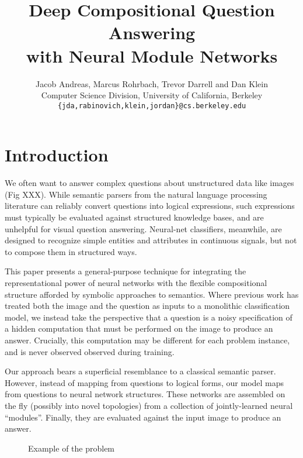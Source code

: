 \documentclass{article} %
\title{Deep Compositional Question Answering \\ with Neural Module Networks}
\author{
  Jacob Andreas, Marcus Rohrbach, Trevor Darrell and Dan Klein \\
Computer Science Division,
University of California, Berkeley \\
\texttt{\{jda,rabinovich,klein,jordan\}@cs.berkeley.edu} \\
}
\theoremstyle{definition}
\theoremstyle{example}
\begin{document}
\maketitle

\begin{abstract}
\end{abstract}

\section{Introduction}

We often want to answer complex questions about unstructured data like images
(Fig XXX). While semantic parsers from the natural language processing
literature can reliably convert questions into logical expressions, such
expressions must typically be evaluated against structured knowledge bases, and
are unhelpful for visual question answering.  Neural-net classifiers, meanwhile,
are designed to recognize simple entities and attributes in continuous signals,
but not to compose them in structured ways.

This paper presents a general-purpose technique for integrating the
representational power of neural networks with the flexible compositional
structure afforded by symbolic approaches to semantics.  Where previous work has
treated both the image and the question as inputs to a monolithic classification
model, we instead take the perspective that a question is a noisy specification
of a hidden computation that must be performed on the image to produce an
answer. Crucially, this computation may be different for each problem instance,
and is never observed observed during training.

Our approach bears a superficial resemblance to a classical semantic parser.
However, instead of mapping from questions to logical forms, our model maps from
questions to neural network structures. These networks are assembled on the fly
(possibly into novel topologies) from a collection of jointly-learned neural
``modules''. Finally, they are evaluated against the input image to produce an
answer.

\begin{figure}
  \center
  \caption{Example of the problem}
\end{figure}

\end{document}
